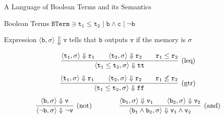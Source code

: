 \documentclass{beamer}
\begin{document}
\begin{frame}{A Language of Boolean Terms and its Semantics}

        \begin{block}{Boolean Terms}
        $\mathtt{BTerm} \ni \mathtt{t_1 \leq t_2} \mid \mathtt{b \wedge c}
        \mid \mathtt{\neg b}$
	\end{block}

        Expression $\langle \mathtt{b},\sigma \rangle \Downarrow
        \mathtt{v}$ tells that $\mathtt{b}$ outputs
        $\mathtt{v}$ if the memory is $\sigma$

        \[
                \infer[(\text{leq})]
                { 
                        \langle \mathtt{t_1 \leq t_2}, \sigma \rangle \Downarrow \mathtt{tt} 
                }
                {
                        \langle \mathtt{t_1}, \sigma \rangle \Downarrow \mathtt{r_1} \qquad
                        \langle \mathtt{t_2}, \sigma \rangle \Downarrow \mathtt{r_2}
                        \qquad \mathtt{r_1 \leq r_2}
                } 
        \] 
        \vspace{0.1cm}
        \[
                \infer[(\text{gtr})]
                { 
                        \langle \mathtt{t_1 \leq t_2}, \sigma \rangle \Downarrow \mathtt{ff} 
                }
                {
                        \langle \mathtt{t_1}, \sigma \rangle \Downarrow \mathtt{r_1} \qquad
                        \langle \mathtt{t_2}, \sigma \rangle \Downarrow \mathtt{r_2}
                        \qquad \mathtt{r_1 \not \leq r_2}
                }
        \]
        \vspace{0.1cm}
        \[        
                \infer[(\text{not})]{  
                        \langle \mathtt{\neg \mathtt{b}}, \sigma \rangle \Downarrow 
                        \mathtt{\neg v}
                        }{
                        \langle \mathtt{b}, \sigma \rangle \Downarrow \mathtt{v}
                } \qquad \qquad
                \infer[(\text{and})]{  
                        \langle \mathtt{b_1} \wedge \mathtt{b_2}, \sigma \rangle \Downarrow 
                        \mathtt{v_1 \wedge v_2}
                        }{
                        \langle \mathtt{b_1}, \sigma \rangle \Downarrow \mathtt{v_1} \qquad
                        \langle \mathtt{b_2}, \sigma \rangle \Downarrow \mathtt{v_2}
                }
        \]
\end{frame}        
\end{document}
